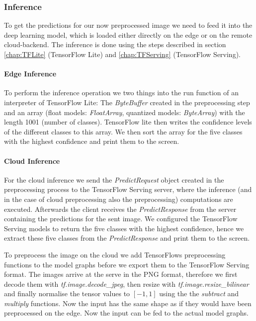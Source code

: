 

\subsubsection{Inference}
To get the predictions for our now preprocessed image we need to feed it into the deep learning model, which is loaded either directly on the edge or on the remote cloud-backend. 
The inference is done using the steps described in section \ref{chap:TFLite} (TensorFlow Lite) and \ref{chap:TFServing} (TensorFlow Serving).
\paragraph{Edge Inference}
To perform the inference operation we two things into the run function of an interpreter of TensorFlow Lite: The \emph{ByteBuffer} created in the preprocessing step and an array (float models: \emph{FloatArray}, quantized models: \emph{ByteArray}) with the length 1001 (number of classes). TensorFlow lite then writes the confidence levels of the different classes to this array. We then sort the array for the five classes with the highest confidence and print them to the screen.

\paragraph{Cloud Inference}

For the cloud inference we send the \emph{PredictRequest} object created in the preprocessing process to the TensorFlow Serving server, where the inference (and in the case of cloud preprocessing also the preprocessing) computations are executed. Afterwards the client receives the \emph{PredictResponse} from the server containing the predictions for the sent image. We configured the TensorFlow Serving models to return the five classes with the highest confidence, hence we extract these five classes from the \emph{PredictResponse} and print them to the screen.

To preprocess the image on the cloud we add TensorFlows preprocessing functions to the model graphs before we export them to the TensorFlow Serving format. The images arrive at the serve in the PNG format, therefore we first decode them with \emph{tf.image.decode\_jpeg}, then resize with \emph{tf.image.resize\_bilinear} and finally normalise the tensor values to $[-1,1]$ using the the \emph{subtract} and \emph{multiply} functions. Now the input has the same shape as if they would have been preprocessed on the edge. Now the input can be fed to the actual model graphs.
